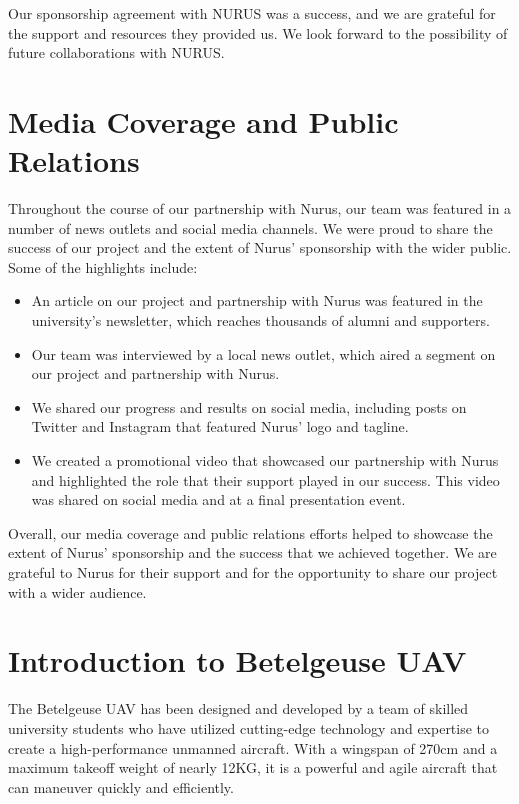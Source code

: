 \documentclass{article}
\begin{document}
Our sponsorship agreement with NURUS was a success, and we are grateful for the support and resources they provided us. We look forward to the possibility of future collaborations with NURUS.

\section{Media Coverage and Public Relations}

Throughout the course of our partnership with Nurus, our team was featured in a number of news outlets and social media channels. We were proud to share the success of our project and the extent of Nurus' sponsorship with the wider public. Some of the highlights include:

\begin{itemize}
\item An article on our project and partnership with Nurus was featured in the university's newsletter, which reaches thousands of alumni and supporters.
\item Our team was interviewed by a local news outlet, which aired a segment on our project and partnership with Nurus.
\item We shared our progress and results on social media, including posts on Twitter and Instagram that featured Nurus' logo and tagline.
\item We created a promotional video that showcased our partnership with Nurus and highlighted the role that their support played in our success. This video was shared on social media and at a final presentation event.
\end{itemize}

Overall, our media coverage and public relations efforts helped to showcase the extent of Nurus' sponsorship and the success that we achieved together. We are grateful to Nurus for their support and for the opportunity to share our project with a wider audience.

\section{Introduction to Betelgeuse UAV}

The Betelgeuse UAV has been designed and developed by a team of skilled university students who have utilized cutting-edge technology and expertise to create a high-performance unmanned aircraft. With a wingspan of 270cm and a maximum takeoff weight of nearly 12KG, it is a powerful and agile aircraft that can maneuver quickly and efficiently.
\end{document}
